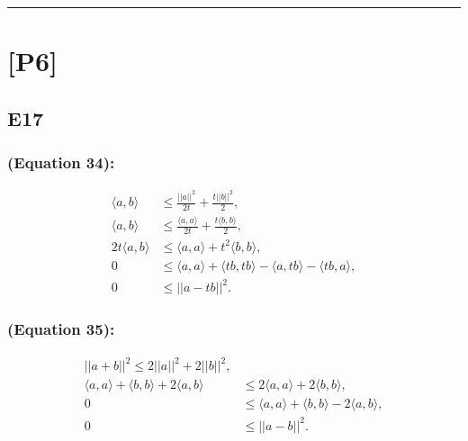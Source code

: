 \documentclass[12pt]{article}
\begin{document}

\hrule
\vspace{0.1cm}
\section*{[P6]}
\subsection*{E17}
\subsubsection*{(Equation 34):}
\begin{equation}
    \begin{split}
        \langle a, b \rangle &\leq \frac{||a||^2}{2t} + \frac{t||b||^2}{2}, \\
        \langle a, b \rangle &\leq \frac{\langle a, a \rangle}{2t} + \frac{t \langle b, b \rangle}{2}, \\
        2t \langle a, b \rangle &\leq \langle a, a \rangle + t^2 \langle b, b \rangle, \\
        0 &\leq \langle a, a \rangle + \langle tb, tb \rangle - \langle a, tb \rangle - \langle tb, a \rangle, \\
        0 &\leq ||a - tb||^2. 
    \end{split}
\end{equation}
\subsubsection*{(Equation 35):}
\begin{equation}
    \begin{split}
        ||a+b||^2 \leq 2||a||^2 + 2||b||^2, \\
        \langle a, a\rangle + \langle b, b\rangle + 2 \langle a, b\rangle & \leq 2\langle a, a\rangle + 2\langle b, b\rangle, \\
        0 &\leq \langle a, a\rangle + \langle b, b\rangle -  2 \langle a, b\rangle, \\
        0 &\leq ||a-b||^2.
    \end{split}    
\end{equation}
\end{document}
